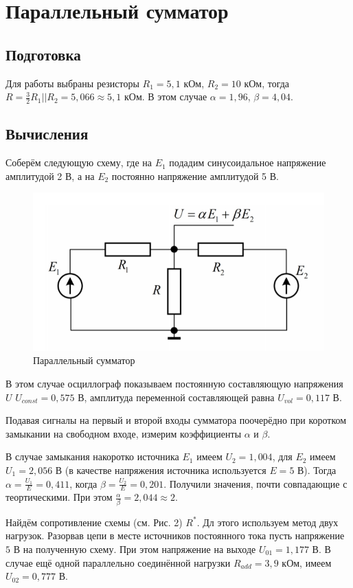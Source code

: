 \documentclass[a4paper, 12pt]{article} %
\begin{document}
\section{Параллельный сумматор}

\subsection{Подготовка}

Для работы выбраны резисторы $R_1 = 5,1$ кОм, $R_2 = 10$ кОм, тогда $R = \frac{3}{2} R_1 || R_2 = 5,066 \approx 5,1$ кОм. В этом случае $\alpha = 1,96$, $\beta = 4,04$.

\subsection{Вычисления}

Соберём следующую схему, где на $E_1$ подадим синусоидальное напряжение амплитудой 2 В, а на $E_2$ постоянно напряжение амплитудой 5 В.

\begin{figure}[h]
    \centering
    \includegraphics[width = 8 cm]{1.png}
    \caption{Параллельный сумматор}
    \label{fig:vac}
\end{figure}

В этом случае осциллограф показываем постоянную составляющую напряжения $U$ $U_{const} = 0,575$ В, амплитуда переменной составляющей равна $U_{vol} = 0,117$ В.

Подавая сигналы на первый и второй входы сумматора
поочерёдно при коротком замыкании на свободном входе, измерим коэффициенты $\alpha$ и $\beta$. 

В случае замыкания накоротко источника $E_1$ имеем $U_2 = 1,004$, для $E_2$ имеем $U_1 = 2,056$ В (в качестве напряжения источника используется $E = 5$ В). Тогда $\alpha = \frac{U_1}{E} = 0,411$, когда $\beta = \frac{U_2}{E} = 0,201$. Получили значения, почти совпадающие с теортическими. При этом $\frac{\alpha}{\beta} = 2,044 \approx 2$.

Найдём сопротивление схемы (см. Рис. 2) $R^*$. Дл этого используем метод двух нагрузок. Разорвав цепи в месте источников постоянного тока пусть напряжение $5$ В на полученную схему. При этом напряжение на выходе $U_{01} = 1,177$ В. В случае ещё одной параллельно соединённой нагрузки $R_{add} = 3,9$ кОм, имеем $U_{02} = 0,777$ В.
\end{document}
